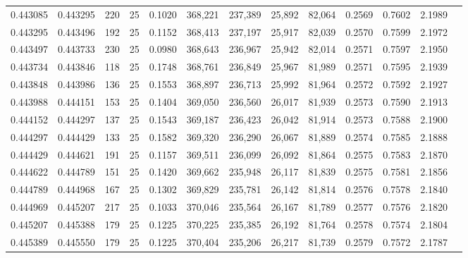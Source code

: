 \begin{tabular}{rrrrrrrrrrrrr}
0.443085 & 0.443295 &   220 &  25 &                                     0.1020 & 368,221 & 237,389 &  25,892 &  82,064 & 0.2569 & 0.7602 & 2.1989 \\
0.443295 & 0.443496 &   192 &  25 &                                     0.1152 & 368,413 & 237,197 &  25,917 &  82,039 & 0.2570 & 0.7599 & 2.1972 \\
0.443497 & 0.443733 &   230 &  25 &                                     0.0980 & 368,643 & 236,967 &  25,942 &  82,014 & 0.2571 & 0.7597 & 2.1950 \\
0.443734 & 0.443846 &   118 &  25 &                                     0.1748 & 368,761 & 236,849 &  25,967 &  81,989 & 0.2571 & 0.7595 & 2.1939 \\
0.443848 & 0.443986 &   136 &  25 &                                     0.1553 & 368,897 & 236,713 &  25,992 &  81,964 & 0.2572 & 0.7592 & 2.1927 \\
0.443988 & 0.444151 &   153 &  25 &                                     0.1404 & 369,050 & 236,560 &  26,017 &  81,939 & 0.2573 & 0.7590 & 2.1913 \\
0.444152 & 0.444297 &   137 &  25 &                                     0.1543 & 369,187 & 236,423 &  26,042 &  81,914 & 0.2573 & 0.7588 & 2.1900 \\
0.444297 & 0.444429 &   133 &  25 &                                     0.1582 & 369,320 & 236,290 &  26,067 &  81,889 & 0.2574 & 0.7585 & 2.1888 \\
0.444429 & 0.444621 &   191 &  25 &                                     0.1157 & 369,511 & 236,099 &  26,092 &  81,864 & 0.2575 & 0.7583 & 2.1870 \\
0.444622 & 0.444789 &   151 &  25 &                                     0.1420 & 369,662 & 235,948 &  26,117 &  81,839 & 0.2575 & 0.7581 & 2.1856 \\
0.444789 & 0.444968 &   167 &  25 &                                     0.1302 & 369,829 & 235,781 &  26,142 &  81,814 & 0.2576 & 0.7578 & 2.1840 \\
0.444969 & 0.445207 &   217 &  25 &                                     0.1033 & 370,046 & 235,564 &  26,167 &  81,789 & 0.2577 & 0.7576 & 2.1820 \\
0.445207 & 0.445388 &   179 &  25 &                                     0.1225 & 370,225 & 235,385 &  26,192 &  81,764 & 0.2578 & 0.7574 & 2.1804 \\
0.445389 & 0.445550 &   179 &  25 &                                     0.1225 & 370,404 & 235,206 &  26,217 &  81,739 & 0.2579 & 0.7572 & 2.1787 \\

\end{tabular}
